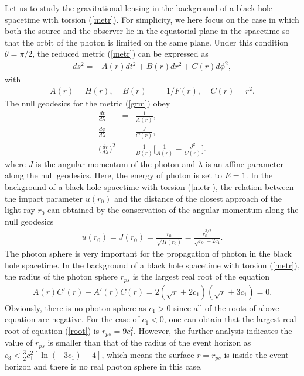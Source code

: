 \documentclass[aps,showpacs,preprintnumbers,amsmath,amssymb]{revtex4}
\begin{document}
Let us to study the gravitational lensing in the background of a black hole spacetime with torsion (\ref{metr}). For simplicity, we here focus on the case in which both the source and the observer lie in the equatorial plane in the spacetime so that the orbit of the photon is limited on the same plane. Under this condition $\theta=\pi/2$, the reduced metric (\ref{metr}) can be expressed as
\begin{eqnarray}
ds^2=-A(r)dt^2+B(r)dr^2+C(r)d\phi^2,\label{grm}
\end{eqnarray}
with
\begin{eqnarray}
A(r)=H(r), \;\;\;\;B(r)&=&1/F(r),\;\;\;\; C(r)=r^2.
\end{eqnarray}
The null geodesics for the metric (\ref{grm}) obey
\begin{eqnarray}
\frac{dt}{d\lambda}&=&\frac{1}{A(r)},\label{u3}\\
\frac{d\phi}{d\lambda}&=&\frac{J}{C(r)},\label{u4}\\
\bigg(\frac{dr}{d\lambda}\bigg)^2&=&\frac{1}{B(r)}\bigg[\frac{1}{A(r)}
-\frac{J^2}{C(r)}\bigg].\label{cedi}
\end{eqnarray}
where $J$ is the angular momentum of the photon and $\lambda$ is an affine parameter along the null geodesics. Here, the energy of photon is set to $E=1$. In the background of a black hole spacetime with torsion (\ref{metr}), the relation
between the impact parameter $u(r_0)$ and the distance of the closest approach of the light ray $r_0$ can obtained by the conservation of the
angular momentum along the null geodesics
\begin{eqnarray}
u(r_0)=J(r_0)=\frac{r_0}{\sqrt{H(r_0)}}=\frac{r_0^{3/2}}{\sqrt{r_0}+2c_1}.
\end{eqnarray}
The photon sphere is very important for the propagation of photon in the black hole spacetime. In the background of a black hole spacetime with torsion (\ref{metr}), the radius of the photon sphere $r_{ps}$ is the largest
real root of the equation
\begin{eqnarray}
A(r)C'(r)-A'(r)C(r)=2(\sqrt{r}+2c_1)(\sqrt{r}+3c_1)=0.\label{root}
\end{eqnarray}
Obviously, there is no photon sphere as $c_1>0$ since all of the roots of above equation are negative. For the case of $c_1<0$, one can obtain that the largest
real root of equation (\ref{root}) is $r_{ps}=9c^2_1$. However, the further analysis indicates the value of $r_{ps}$ is smaller than that of the radius of the event horizon as $c_3<\frac{3}2c^2_1[\ln(-3c_1)-4]$, which means the surface $r=r_{ps}$ is inside the event horizon and there is no real photon sphere in this case.
\end{document}

